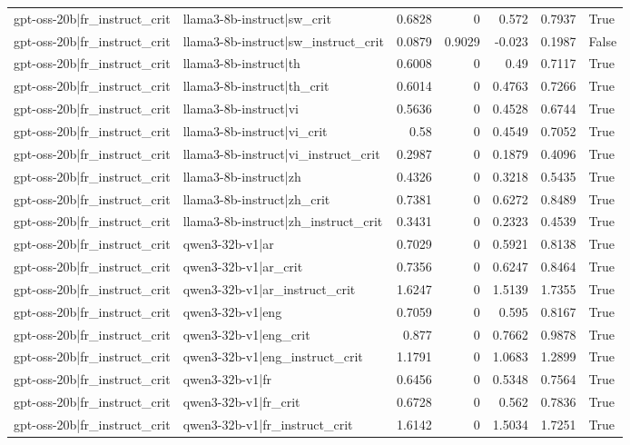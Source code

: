 \begin{table}
\begin{tabular}{l l r r r r l}
gpt-oss-20b|fr_instruct_crit & llama3-8b-instruct|sw_crit & 0.6828 & 0 & 0.572 & 0.7937 & True \\
gpt-oss-20b|fr_instruct_crit & llama3-8b-instruct|sw_instruct_crit & 0.0879 & 0.9029 & -0.023 & 0.1987 & False \\
gpt-oss-20b|fr_instruct_crit & llama3-8b-instruct|th & 0.6008 & 0 & 0.49 & 0.7117 & True \\
gpt-oss-20b|fr_instruct_crit & llama3-8b-instruct|th_crit & 0.6014 & 0 & 0.4763 & 0.7266 & True \\
gpt-oss-20b|fr_instruct_crit & llama3-8b-instruct|vi & 0.5636 & 0 & 0.4528 & 0.6744 & True \\
gpt-oss-20b|fr_instruct_crit & llama3-8b-instruct|vi_crit & 0.58 & 0 & 0.4549 & 0.7052 & True \\
gpt-oss-20b|fr_instruct_crit & llama3-8b-instruct|vi_instruct_crit & 0.2987 & 0 & 0.1879 & 0.4096 & True \\
gpt-oss-20b|fr_instruct_crit & llama3-8b-instruct|zh & 0.4326 & 0 & 0.3218 & 0.5435 & True \\
gpt-oss-20b|fr_instruct_crit & llama3-8b-instruct|zh_crit & 0.7381 & 0 & 0.6272 & 0.8489 & True \\
gpt-oss-20b|fr_instruct_crit & llama3-8b-instruct|zh_instruct_crit & 0.3431 & 0 & 0.2323 & 0.4539 & True \\
gpt-oss-20b|fr_instruct_crit & qwen3-32b-v1|ar & 0.7029 & 0 & 0.5921 & 0.8138 & True \\
gpt-oss-20b|fr_instruct_crit & qwen3-32b-v1|ar_crit & 0.7356 & 0 & 0.6247 & 0.8464 & True \\
gpt-oss-20b|fr_instruct_crit & qwen3-32b-v1|ar_instruct_crit & 1.6247 & 0 & 1.5139 & 1.7355 & True \\
gpt-oss-20b|fr_instruct_crit & qwen3-32b-v1|eng & 0.7059 & 0 & 0.595 & 0.8167 & True \\
gpt-oss-20b|fr_instruct_crit & qwen3-32b-v1|eng_crit & 0.877 & 0 & 0.7662 & 0.9878 & True \\
gpt-oss-20b|fr_instruct_crit & qwen3-32b-v1|eng_instruct_crit & 1.1791 & 0 & 1.0683 & 1.2899 & True \\
gpt-oss-20b|fr_instruct_crit & qwen3-32b-v1|fr & 0.6456 & 0 & 0.5348 & 0.7564 & True \\
gpt-oss-20b|fr_instruct_crit & qwen3-32b-v1|fr_crit & 0.6728 & 0 & 0.562 & 0.7836 & True \\
gpt-oss-20b|fr_instruct_crit & qwen3-32b-v1|fr_instruct_crit & 1.6142 & 0 & 1.5034 & 1.7251 & True \\

\end{tabular}
\end{table}
